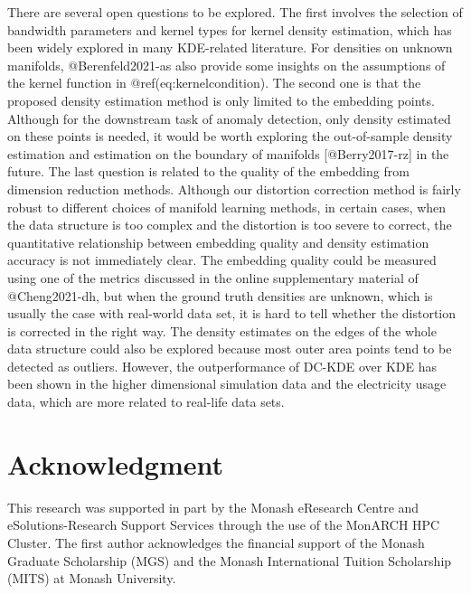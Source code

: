 \documentclass[
]{article}
\begin{document}
There are several open questions to be explored. The first involves the
selection of bandwidth parameters and kernel types for kernel density
estimation, which has been widely explored in many KDE-related
literature. For densities on unknown manifolds, @Berenfeld2021-as also
provide some insights on the assumptions of the kernel function in
@ref(eq:kernelcondition). The second one is that the proposed density
estimation method is only limited to the embedding points. Although for
the downstream task of anomaly detection, only density estimated on
these points is needed, it would be worth exploring the out-of-sample
density estimation and estimation on the boundary of manifolds
{[}@Berry2017-rz{]} in the future. The last question is related to the
quality of the embedding from dimension reduction methods. Although our
distortion correction method is fairly robust to different choices of
manifold learning methods, in certain cases, when the data structure is
too complex and the distortion is too severe to correct, the
quantitative relationship between embedding quality and density
estimation accuracy is not immediately clear. The embedding quality
could be measured using one of the metrics discussed in the online
supplementary material of @Cheng2021-dh, but when the ground truth
densities are unknown, which is usually the case with real-world data
set, it is hard to tell whether the distortion is corrected in the right
way. The density estimates on the edges of the whole data structure
could also be explored because most outer area points tend to be
detected as outliers. However, the outperformance of DC-KDE over KDE has
been shown in the higher dimensional simulation data and the electricity
usage data, which are more related to real-life data sets.

\hypertarget{acknowledgment}{%
\section*{Acknowledgment}\label{acknowledgment}}

This research was supported in part by the Monash eResearch Centre and
eSolutions-Research Support Services through the use of the MonARCH HPC
Cluster. The first author acknowledges the financial support of the
Monash Graduate Scholarship (MGS) and the Monash International Tuition
Scholarship (MITS) at Monash University.
\end{document}

